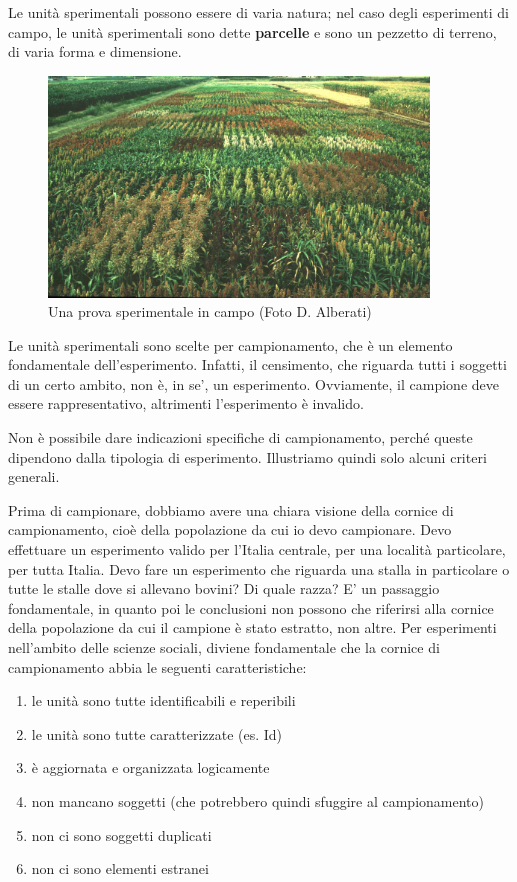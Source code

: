 \documentclass[a4paper,12pt,oneside]{book}
\providecommand{\tightlist}{%
  \setlength{\itemsep}{0pt}\setlength{\parskip}{0pt}}
\begin{document}
Le unità sperimentali possono essere di varia natura; nel caso degli
esperimenti di campo, le unità sperimentali sono dette \textbf{parcelle}
e sono un pezzetto di terreno, di varia forma e dimensione.

\begin{figure}
\centering
\includegraphics[width=0.90000\textwidth]{_images/SorgoProveVarietali.jpg}
\caption{Una prova sperimentale in campo (Foto D. Alberati)}
\end{figure}

Le unità sperimentali sono scelte per campionamento, che è un elemento
fondamentale dell'esperimento. Infatti, il censimento, che riguarda
tutti i soggetti di un certo ambito, non è, in se', un esperimento.
Ovviamente, il campione deve essere rappresentativo, altrimenti
l'esperimento è invalido.

Non è possibile dare indicazioni specifiche di campionamento, perché
queste dipendono dalla tipologia di esperimento. Illustriamo quindi solo
alcuni criteri generali.

Prima di campionare, dobbiamo avere una chiara visione della cornice di
campionamento, cioè della popolazione da cui io devo campionare. Devo
effettuare un esperimento valido per l'Italia centrale, per una località
particolare, per tutta Italia. Devo fare un esperimento che riguarda una
stalla in particolare o tutte le stalle dove si allevano bovini? Di
quale razza? E' un passaggio fondamentale, in quanto poi le conclusioni
non possono che riferirsi alla cornice della popolazione da cui il
campione è stato estratto, non altre. Per esperimenti nell'ambito delle
scienze sociali, diviene fondamentale che la cornice di campionamento
abbia le seguenti caratteristiche:

\begin{enumerate}
\def\labelenumi{\arabic{enumi}.}
\tightlist
\item
  le unità sono tutte identificabili e reperibili
\item
  le unità sono tutte caratterizzate (es. Id)
\item
  è aggiornata e organizzata logicamente
\item
  non mancano soggetti (che potrebbero quindi sfuggire al campionamento)
\item
  non ci sono soggetti duplicati
\item
  non ci sono elementi estranei
\end{enumerate}
\end{document}
